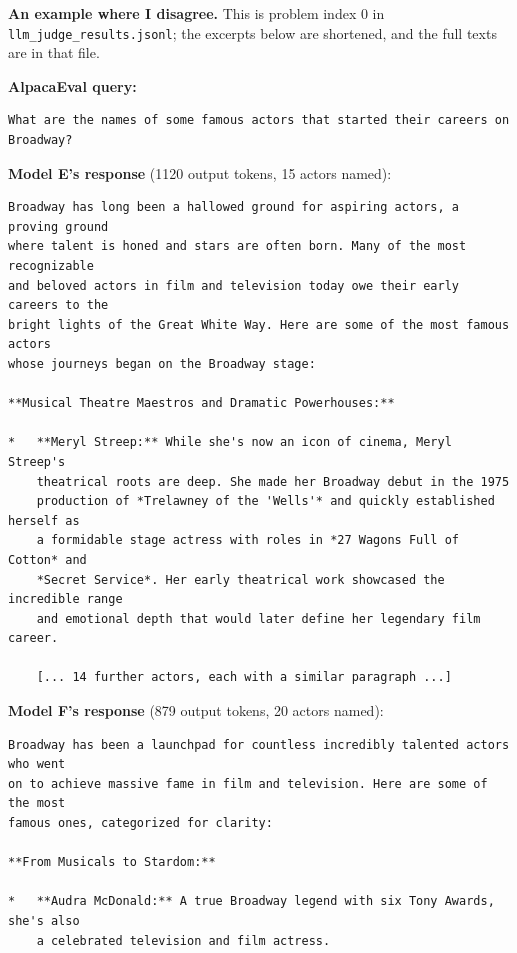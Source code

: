 \begin{answer}
\textbf{An example where I disagree.} This is problem index 0 in
\texttt{llm\_judge\_results.jsonl}; the excerpts below are shortened, and the
full texts are in that file.

\textbf{AlpacaEval query:}

\begin{lstlisting}[language={},numbers=none,basicstyle=\footnotesize\ttfamily,frame=single]
What are the names of some famous actors that started their careers on Broadway?
\end{lstlisting}

\textbf{Model E's response} (1120 output tokens, 15 actors named):

\begin{lstlisting}[language={},numbers=none,basicstyle=\footnotesize\ttfamily,frame=single]
Broadway has long been a hallowed ground for aspiring actors, a proving ground
where talent is honed and stars are often born. Many of the most recognizable
and beloved actors in film and television today owe their early careers to the
bright lights of the Great White Way. Here are some of the most famous actors
whose journeys began on the Broadway stage:

**Musical Theatre Maestros and Dramatic Powerhouses:**

*   **Meryl Streep:** While she's now an icon of cinema, Meryl Streep's
    theatrical roots are deep. She made her Broadway debut in the 1975
    production of *Trelawney of the 'Wells'* and quickly established herself as
    a formidable stage actress with roles in *27 Wagons Full of Cotton* and
    *Secret Service*. Her early theatrical work showcased the incredible range
    and emotional depth that would later define her legendary film career.

    [... 14 further actors, each with a similar paragraph ...]
\end{lstlisting}

\textbf{Model F's response} (879 output tokens, 20 actors named):

\begin{lstlisting}[language={},numbers=none,basicstyle=\footnotesize\ttfamily,frame=single]
Broadway has been a launchpad for countless incredibly talented actors who went
on to achieve massive fame in film and television. Here are some of the most
famous ones, categorized for clarity:

**From Musicals to Stardom:**

*   **Audra McDonald:** A true Broadway legend with six Tony Awards, she's also
    a celebrated television and film actress.


\end{lstlisting}
\end{answer}
